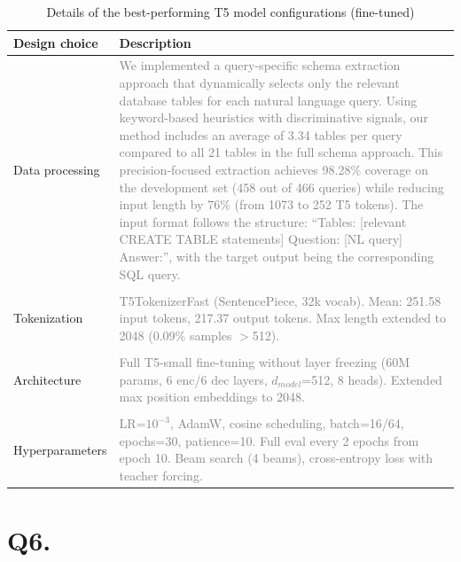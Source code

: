 \documentclass{article}
\begin{document}
\begin{table}[h!]
\centering
\begin{tabular}{p{3.5cm}p{10cm}}
\toprule
Design choice & Description \\
\midrule
Data processing & \textcolor{gray}{We implemented a query-specific schema extraction approach that dynamically selects only the relevant database tables for each natural language query. Using keyword-based heuristics with discriminative signals, our method includes an average of 3.34 tables per query compared to all 21 tables in the full schema approach. This precision-focused extraction achieves 98.28\% coverage on the development set (458 out of 466 queries) while reducing input length by 76\% (from 1073 to 252 T5 tokens). The input format follows the structure: ``Tables: [relevant CREATE TABLE statements] Question: [NL query] Answer:'', with the target output being the corresponding SQL query. } \\

\\
Tokenization & \textcolor{gray}{T5TokenizerFast (SentencePiece, 32k vocab). Mean: 251.58 input tokens, 217.37 output tokens. Max length extended to 2048 (0.09\% samples $>$512).} \\
\\
Architecture & \textcolor{gray}{Full T5-small fine-tuning without layer freezing (60M params, 6 enc/6 dec layers, $d_{model}$=512, 8 heads). Extended max position embeddings to 2048. } \\
\\
Hyperparameters & \textcolor{gray}{LR=$10^{-3}$, AdamW, cosine scheduling, batch=16/64, epochs=30, patience=10. Full eval every 2 epochs from epoch 10. Beam search (4 beams), cross-entropy loss with teacher forcing. } \\
\bottomrule
\end{tabular}
\caption{Details of the best-performing T5 model configurations (fine-tuned)}
\label{tab:t5_results_ft}
\end{table}
\newpage






\section*{Q6. }
\end{document}
